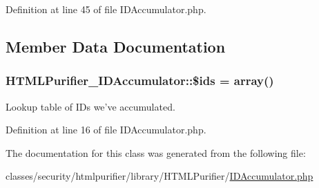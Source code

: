 Definition at line 45 of file I\+D\+Accumulator.\+php.



\subsection{Member Data Documentation}
\hypertarget{classHTMLPurifier__IDAccumulator_a8b1925aa347f0da5360b5daff2915f31}{
\subsubsection[{\$ids}]{\setlength{\rightskip}{0pt plus 5cm}H\+T\+M\+L\+Purifier\+\_\+\+I\+D\+Accumulator\+::\$ids = array()}}\label{classHTMLPurifier__IDAccumulator_a8b1925aa347f0da5360b5daff2915f31}
Lookup table of I\+Ds we've accumulated. 

Definition at line 16 of file I\+D\+Accumulator.\+php.



The documentation for this class was generated from the following file\+:\begin{DoxyCompactItemize}
\item 
classes/security/htmlpurifier/library/\+H\+T\+M\+L\+Purifier/\hyperlink{IDAccumulator_8php}{I\+D\+Accumulator.\+php}\end{DoxyCompactItemize}
